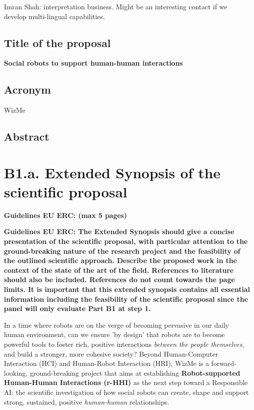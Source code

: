 \documentclass[]{article}
\newcommand{\project}{WizMe\xspace}
\newcommand{\eu}[1]{{\color{teal}\textbf{Guidelines EU ERC: #1}}}
\begin{document}
Imran Shah: interpretation business. Might be an interesting contact if we
develop multi-lingual capabilities.

\subsection*{Title of the proposal}\label{title-of-the-proposal}

\textbf{Social robots to support human-human interactions}

\subsection*{Acronym}\label{acronym}

\project

\subsection*{Abstract}\label{abstract}

\pagebreak

\section{B1.a. Extended Synopsis of the scientific proposal}\label{part1}
\eu{(max 5 pages)}

\eu{The Extended Synopsis should give a concise presentation of the scientific
proposal, with particular attention to the ground-breaking nature of the
research project and the feasibility of the outlined scientific approach.
Describe the proposed work in the context of the state of the art of the field.
References to literature should also be included. References do not count
towards the page limits. It is important that this extended synopsis contains
all essential information including the feasibility of the scientific proposal
since the panel will only evaluate Part B1 at step 1.}


In a time where robots are on the verge of becoming pervasive in our daily human
environment, can we ensure 'by design' that robots are to become powerful tools
to foster rich, positive interactions \emph{between the people themselves}, and
build a stronger, more cohesive society? Beyond Human-Computer Interaction (HCI)
and Human-Robot Interaction (HRI), \project is a forward-looking,
ground-breaking project that aims at establishing \textbf{Robot-supported
Human-Human Interactions (r-HHI)} as the next step toward a Responsible AI: the
scientific investigation of how social robots can create, shape and support
strong, sustained, positive \emph{human-human} relationships.
\end{document}
